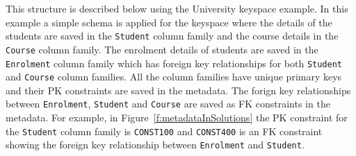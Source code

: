 This structure is described below using the University
 keyspace example. In this example  a simple schema is applied for the
 keyspace where  the details of the students are saved in  the \texttt{Student}
 column family and the course details in the \texttt{Course} column family.
 The enrolment details of students are saved in the 
\texttt{Enrolment} column family which has foreign key relationships  for both
\texttt{Student} and \texttt{Course} column families. All the column families
 have unique primary keys and their \ac{PK} constraints are saved in the
metadata. The forign key relationships between \texttt{Enrolment},
\texttt{Student} and \texttt{Course} are saved as \ac{FK} constraints in the
metadata. For example, in Figure~\ref{f:metadataInSolutions} the \ac{PK}
constraint for the \texttt{Student} column family is \texttt{CONST100}  and
\texttt{CONST400} is an \ac{FK} constraint showing the foreign key
relationship between \texttt{Enrolment} and \texttt{Student}.

